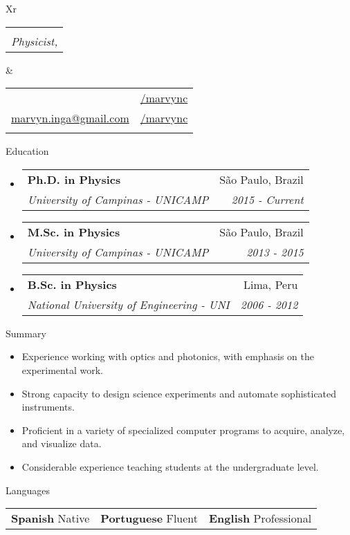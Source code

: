 \documentclass[letterpaper, 11pt]{article}[leftmargin=*]
\makeatletter
\def \fullname {\Huge Marvyn Inga}
\def \subtitle {Physicist, \faMale}
\def \linkedinicon {\faLinkedin}
\def \linkedinlink {https://www.linkedin.com/in/marvync/}
\def \linkedintext {/marvync}
\def \phoneicon {\faPhone}
\def \phonetext {+55-21-975106507}
\def \emailicon {\faEnvelope}
\def \emaillink {mailto:marvyn.inga@gmail.com}
\def \emailtext {marvyn.inga@gmail.com}
\def \githubicon {\faGithub}
\def \githublink {https://github.com/marvync}
\def \githubtext {/marvync}
\def \headertype {\doublecol} %
\def \linkedin {\linkedinicon \hspace{3pt}\href{\linkedinlink}{\linkedintext}}
\def \phone {\phoneicon \hspace{3pt}{ \phonetext}}
\def \email {\emailicon \hspace{3pt}\href{\emaillink}{\emailtext}}
\def \github {\githubicon \hspace{3pt}\href{\githublink}{\githubtext}}
\renewcommand{\section}[2]{
  \colorbox{boxcol}{\color{secondary}\raggedbottom\normalsize{#1}{\hspace{2pt}#2}}
}
\newcommand{\resumeEntryStart}{\begin{itemize}[leftmargin=2.5mm]\itemsep8pt}
\newcommand{\resumeEntryEnd}{\end{itemize}}
\newcommand{\resumeItemListStart}{\begin{itemize}[leftmargin=4.5mm]\itemsep-3pt}
\newcommand{\resumeItemListEnd}{\end{itemize}}
\newcommand{\resumeItem}[1]{
  \item\small{
    {#1}
  }
}
\newcommand{\resumeEntryTSDL}[4]{
  \item[]
    \begin{tabularx}{0.98\textwidth}{X@{\hspace{60pt}}r}
      \textbf{\color{primary}#1} & {\firabook\color{accent}\small#2} \\
      \vspace{-0.35cm}
      \textit{\color{accent}\small#3} & \textit{\color{accent}\small#4} \\
    \end{tabularx}\vspace{-0.35cm}
}
\newcommand{\resumeEntryS}[2]{
  \item[]\small{
    \textbf{\color{primary}#1 }{ #2 }
  }
}
\newcommand{\triplecol}[3]{
	\vspace{-0.3cm}
	\begin{tabularx}{\textwidth}{XXX}
	{\small#1} & {\small#2} & {\small#3}
	\end{tabularx}
}
\newcommand{\doublecol}[6]{
  \begin{tabularx}{\textwidth}{Xr}
    {
      \begin{tabular}[c]{l}
        \fontsize{35}{45}\selectfont{\color{primary}{{\textbf{\fullname}}}} \\
        {\textit{\subtitle}} %
      \end{tabular}
    } & {
      \begin{tabular}[c]{l@{\hspace{1.5em}}l}
        {\small#4} & {\small#1} \\
        {\small#5} & {\small#2} \\
        {\small#6} & {\small#3}
      \end{tabular}
    }
  \end{tabularx}
\vspace{0.3cm}
}
\newcommand{\singlecol}[6]{
  \begin{tabularx}{\textwidth}{Xr}
    {
      \begin{tabular}[b]{l}
        \fontsize{35}{45}\selectfont{\color{primary}{{\textbf{\fullname}}}} \\
        {\textit{\subtitle}} %
      \end{tabular}
    } & {
      \begin{tabular}[c]{l}
        {\small#1} \\
        {\small#2} \\
        {\small#3} \\
        {\small#4} \\
        {\small#5} \\
        {\small#6}
      \end{tabular}
    }
  \end{tabularx}
}
\makeatother
\begin{document}


\headertype{\linkedin}{\github}{}{\phone}{\email}{} %

\section{\faGraduationCap}{Education}
\resumeEntryStart
	\small
	\resumeEntryTSDL
    {Ph.D. in Physics}{\footnotesize São Paulo, Brazil}
	{\footnotesize University of Campinas - UNICAMP}{\footnotesize 2015 - Current}
	\resumeEntryTSDL
	{M.Sc. in Physics}{\footnotesize São Paulo, Brazil}
	{\footnotesize University of Campinas - UNICAMP}{\footnotesize 2013 - 2015}
	\resumeEntryTSDL
	{B.Sc. in Physics}{\footnotesize Lima, Peru}
	{\footnotesize National University of Engineering - UNI}{\footnotesize 2006 - 2012}
\resumeEntryEnd
\vspace{0.1cm}
\section{\faFolderOpen}{Summary}
\resumeItemListStart
\resumeItem {Experience working with optics and photonics, with emphasis on the experimental work.}
\resumeItem {Strong capacity to design science experiments and automate sophisticated instruments.}
\resumeItem {Proficient in a variety of specialized computer programs to acquire, analyze, and visualize data.}
\resumeItem {Considerable experience teaching students at the undergraduate level.}
\resumeItemListEnd

\section{\faComment}{Languages}
\vspace{-0.2cm}
\resumeEntryStart
	\small
	\triplecol{\resumeEntryS{Spanish}{Native}}{\resumeEntryS{Portuguese}{Fluent}}{\resumeEntryS{English} {Professional}}
\resumeEntryEnd
\end{document}
